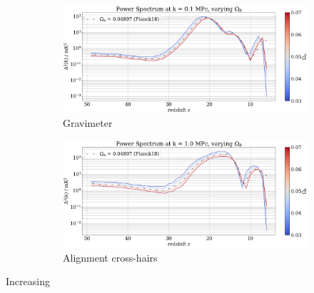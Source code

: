 \documentclass[floats,floatfix,showpacs,amssymb,prd,superscriptaddress,nofootinbib]{revtex4-2} %
\begin{document}
\begin{figure}[H]
     \centering
     \begin{subfigure}[b]{0.9\textwidth}
         \centering
         \includegraphics[width=\textwidth]{images/simulation_results/power_spectrum_fixed_k_0.1_Ob.png}
         \caption{Gravimeter}
         \label{fig:IC_Om1}
     \end{subfigure}
     \hfill
     \begin{subfigure}[b]{0.9\textwidth}
         \centering
         \includegraphics[width=\textwidth]{images/simulation_results/power_spectrum_fixed_k_1.0_Ob.png}
         \caption{Alignment cross-hairs}
         \label{fig:IC_Om5}
     \end{subfigure}
        \caption{}
        \label{fig:apparatus}
\end{figure}

Increasing 
\end{document}
